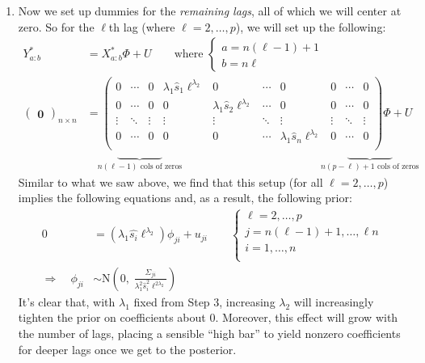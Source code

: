 \documentclass[12pt]{article}
\theoremstyle{plain}
\theoremstyle{definition}
\theoremstyle{remark}
\begin{document}
\begin{enumerate}
    \item Now we set up dummies for the \emph{remaining lags},
	all of which we will center at zero. So for the $\ell$th
	lag (where $\ell = 2, \ldots, p$), we will set up the
	following:
	\begin{align*}
	    Y^*_{a:b} &=
	    X^*_{a:b} \Phi + U \qquad
	    \text{where } \begin{cases} a = n(\ell-1) + 1 \\
					b = n\ell
			\end{cases} \\
	    \begin{pmatrix} \mathbf{0} \end{pmatrix}_{n\times n}
		&= \begin{pmatrix}
		    0 & \cdots & 0 &
		    \lambda_1 \hat{s}_1 \ell^{\lambda_2} & 0 &
		    \cdots & 0 & 0 & \cdots & 0 \\
		    0 & \cdots & 0 & 0
		    & \lambda_1 \hat{s}_2 \ell^{\lambda_2}
		    & \cdots & 0 & 0 & \cdots & 0 \\
		    \vdots & \ddots & \vdots & \vdots & \vdots &
		    \ddots & \vdots  & \vdots & \ddots & \vdots \\
		    0 & \cdots & 0 & 0 & 0 & \cdots
		    & \lambda_1 \hat{s}_n \ell^{\lambda_2}
		    & 0 & \cdots & 0 \\
		\end{pmatrix} \Phi + U \\
	    & \quad \underbrace{\qquad\qquad}_{n(\ell-1)
		\text{ cols of zeros}} \qquad \qquad
		\qquad \qquad \qquad \qquad \;
		\underbrace{\qquad\qquad}_{n(p-\ell) + 1
		\text{ cols of zeros}}
	\end{align*}
	Similar to what we saw above, we find that this
	setup (for all $\ell = 2, \ldots, p$)
	implies the following equations and, as a result,
	the following prior:
	\begin{align*}
	    0 &= \left(\lambda_1
	    \hat{s_i}\ell^{\lambda_2}\right) \phi_{ji} + u_{ji}
	    \qquad
	    \begin{cases} \ell = 2, \ldots, p \\ 
		j = n(\ell-1)+1, \ldots, \ell n\\
		i = 1, \ldots, n \\
	    \end{cases} \\
	\Rightarrow \quad \phi_{ji} &\sim
	    \text{N}\left(0, \; \frac{\Sigma_{ji}}{
	    \lambda_1^2 \hat{s}_i^2 \ell^{2\lambda_2} }\right)
	\end{align*}
	It's clear that, with $\lambda_1$ fixed from Step 3,
	increasing $\lambda_2$ will increasingly tighten
	the prior on coefficients about 0.
	Moreover, this effect will grow with the number of
	lags, placing a sensible ``high bar'' to yield
	nonzero coefficients for deeper lags once we get to
	the posterior.


\end{enumerate}
\end{document}
